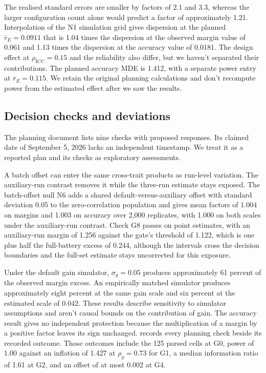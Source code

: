 The realised standard errors are smaller by factors of 2.1 and 3.3, whereas the larger configuration count alone would predict a factor of approximately 1.21. Interpolation of the N1 simulation grid gives dispersion at the planned $\bar r_E=0.0911$ that is 1.04 times the dispersion at the observed margin value of 0.061 and 1.13 times the dispersion at the accuracy value of 0.0181. The design effect at $\rho_{\mathrm{ICC}}=0.15$ and the reliability also differ, but we haven't separated their contributions. The planned accuracy MDE is 1.412, with a separate power entry at $\bar r_E=0.115$. We retain the original planning calculations and don't recompute power from the estimated effect after we saw the results.

\subsection{Decision checks and deviations}
The planning document lists nine checks with proposed responses. Its claimed date of September 5, 2026 lacks an independent timestamp. We treat it as a reported plan and its checks as exploratory assessments.

A batch offset can enter the same cross-trait products as run-level variation. The auxiliary-run contrast removes it while the three-run estimate stays exposed. The batch-offset null N6 adds a shared default-versus-auxiliary offset with standard deviation 0.05 to the zero-correlation population and gives mean factors of 1.004 on margins and 1.003 on accuracy over 2,000 replicates, with 1.000 on both scales under the auxiliary-run contrast. Check G8 passes on point estimates, with an auxiliary-run margin of 1.256 against the gate's threshold of 1.122, which is one plus half the full-battery excess of 0.244, although the intervals cross the decision boundaries and the full-set estimate stays uncorrected for this exposure.

Under the default gain simulator, $\sigma_g=0.05$ produces approximately 61 percent of the observed margin excess. An empirically matched simulator produces approximately eight percent at the same gain scale and six percent at the estimated scale of 0.042. These results describe sensitivity to simulator assumptions and aren't causal bounds on the contribution of gain. The accuracy result gives no independent protection because the multiplication of a margin by a positive factor leaves its sign unchanged.  records every planning check beside its recorded outcome. Those outcomes include the 125 parsed cells at G0, power of 1.00 against an inflation of 1.427 at $\rho_g=0.73$ for G1, a median information ratio of 1.61 at G2, and an offset of at most 0.002 at G4.

